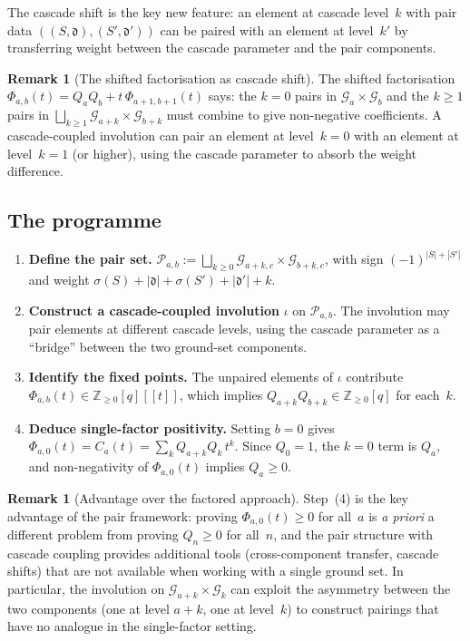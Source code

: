 \documentclass[11pt]{article}
\newcommand{\Z}{\mathbb{Z}}
\theoremstyle{plain}
\theoremstyle{definition}
\newtheorem{remark}[theorem]{Remark}
\begin{document}
The cascade shift is the key new feature: an element at cascade
level~$k$ with pair data
$((S,\mathfrak{d}), (S',\mathfrak{d}'))$ can be paired with
an element at level~$k'$ by transferring weight between the
cascade parameter and the pair components.

\begin{remark}[The shifted factorisation as cascade shift]
The shifted factorisation
$\Phi_{a,b}(t) = Q_a Q_b + t\,\Phi_{a+1,b+1}(t)$ says: the
$k = 0$ pairs in $\mathcal{G}_a \times \mathcal{G}_b$ and the
$k \geq 1$ pairs in
$\bigsqcup_{k \geq 1} \mathcal{G}_{a+k} \times
\mathcal{G}_{b+k}$ must combine to give non-negative
coefficients.  A cascade-coupled involution can pair an element
at level~$k = 0$ with an element at level~$k = 1$ (or higher),
using the cascade parameter to absorb the weight difference.
\end{remark}

\subsection{The programme}

\begin{enumerate}
  \item \textbf{Define the pair set.}
    $\mathcal{P}_{a,b} := \bigsqcup_{k \geq 0}
    \mathcal{G}_{a+k,c} \times \mathcal{G}_{b+k,c}$, with sign
    $(-1)^{|S|+|S'|}$ and weight
    $\sigma(S) + |\mathfrak{d}| + \sigma(S') + |\mathfrak{d}'|
    + k$.

  \item \textbf{Construct a cascade-coupled involution}
    $\iota$ on $\mathcal{P}_{a,b}$.  The involution may pair
    elements at different cascade levels, using the cascade
    parameter as a ``bridge'' between the two ground-set
    components.

  \item \textbf{Identify the fixed points.}
    The unpaired elements of $\iota$ contribute
    $\Phi_{a,b}(t) \in \Z_{\geq 0}[q][\![t]\!]$, which implies
    $Q_{a+k} Q_{b+k} \in \Z_{\geq 0}[q]$ for each~$k$.

  \item \textbf{Deduce single-factor positivity.}
    Setting $b = 0$ gives
    $\Phi_{a,0}(t) = C_a(t) = \sum_k Q_{a+k} Q_k\, t^k$.
    Since $Q_0 = 1$, the $k = 0$ term is $Q_a$, and
    non-negativity of $\Phi_{a,0}(t)$ implies $Q_a \geq 0$.
\end{enumerate}

\begin{remark}[Advantage over the factored approach]
\label{rem:advantage}
Step~(4) is the key advantage of the pair framework: proving
$\Phi_{a,0}(t) \geq 0$ for all~$a$ is \emph{a priori} a
different problem from proving $Q_n \geq 0$ for all~$n$, and
the pair structure with cascade coupling provides additional
tools (cross-component transfer, cascade shifts) that are not
available when working with a single ground set.  In particular,
the involution on $\mathcal{G}_{a+k} \times \mathcal{G}_{k}$
can exploit the asymmetry between the two components (one at
level $a + k$, one at level~$k$) to construct pairings that
have no analogue in the single-factor setting.
\end{remark}
\end{document}

